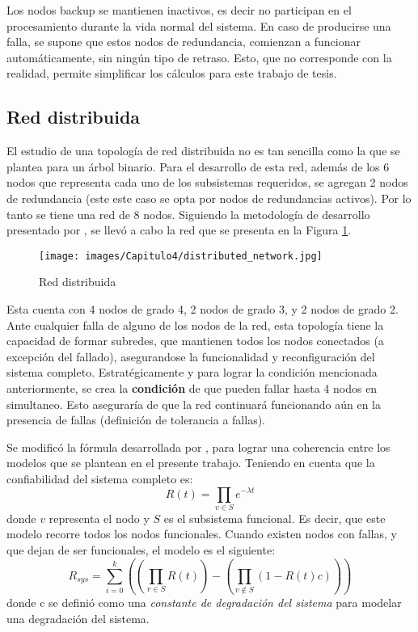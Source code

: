 Los nodos backup se mantienen inactivos, es decir no participan en el procesamiento durante la vida normal del sistema. En caso de producirse una falla, se supone que estos nodos de redundancia, comienzan a funcionar automáticamente, sin ningún tipo de retraso. Esto, que no corresponde con la realidad, permite simplificar los cálculos para este trabajo de tesis.


\subsection{Red distribuida}
El estudio de una topología de red distribuida no es tan sencilla como la que se plantea para un árbol binario. Para el desarrollo de esta red, además de los 6 nodos que representa cada uno de los subsistemas requeridos, se agregan 2 nodos de redundancia (este este caso se opta por nodos de redundancias activos). Por lo tanto se tiene una red de 8 nodos. Siguiendo la metodología de desarrollo presentado por \cite{Pradhan82}, se llevó a cabo la red que se presenta en la Figura \ref{fig:distributed_net}.

\begin{figure}[h]
 \centering
 \texttt{[image: images/Capitulo4/distributed\_network.jpg]}
  \caption{Red distribuida}
\label{fig:distributed_net}
\end{figure}

Esta cuenta con 4 nodos de grado 4, 2 nodos de grado 3, y 2 nodos de grado 2. Ante cualquier falla de alguno de los nodos de la red, esta topología tiene la capacidad de formar subredes, que mantienen todos los nodos conectados (a excepción del fallado), asegurandose la funcionalidad y reconfiguración del sistema completo. Estratégicamente y para lograr la condición mencionada anteriormente, se crea la \textbf{condición} de que pueden fallar hasta 4 nodos en simultaneo. Esto aseguraría de que la red continuará funcionando aún en la presencia de fallas (definición de tolerancia a fallas).

Se modificó la fórmula desarrollada  por \cite{Stivaros92}, para lograr una coherencia entre los modelos que se plantean en el presente trabajo. Teniendo en cuenta que la confiabilidad del sistema completo es: $$R(t) = \prod_{v \in S} e^{- \lambda t}$$
donde $v$ representa el nodo y $S$ es el subsistema funcional. Es decir, que este modelo recorre todos los nodos funcionales. Cuando existen nodos con fallas, y que dejan de ser funcionales, el modelo es el siguiente: $$R_{sys} =\sum_{i=0}^{k} (( \prod_{v \in S} R(t)) - (\prod_{v \notin S} (1 -  R(t) c )))$$
donde c se definió como una \textit{constante de degradación del sistema} para modelar una degradación del sistema.

